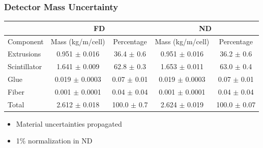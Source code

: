 \documentclass[10pt,professionalfonts,xcolor=table]{beamer}
\begin{document}
\begin{frame}
\frametitle{Detector Mass Uncertainty}
\begin{center}
\small
\begin{tabular}{|l|c|c|c|c|}
\hline
& \multicolumn{2}{c|}{FD} & \multicolumn{2}{c|}{ND} \\ \hline
Component    & Mass (kg/m/cell)   & Percentage & Mass (kg/m/cell) & Percentage \\ \hline
Extrusions   & 0.951 $\pm$ 0.016  & 36.4 $\pm$ 0.6  &  0.951 $\pm$ 0.016  & 36.2 $\pm$ 0.6 \\
Scintillator & 1.641 $\pm$ 0.009  & 62.8 $\pm$ 0.3  &  1.653 $\pm$ 0.011  & 63.0 $\pm$ 0.4 \\
Glue         & 0.019 $\pm$ 0.0003 & 0.07 $\pm$ 0.01 &  0.019 $\pm$ 0.0003 & 0.07 $\pm$ 0.01 \\
Fiber        & 0.001 $\pm$ 0.0001 & 0.04 $\pm$ 0.04 &  0.001 $\pm$ 0.0001 & 0.04 $\pm$ 0.04 \\ \hline
Total        & 2.612 $\pm$ 0.018  & 100.0 $\pm$ 0.7 &  2.624 $\pm$ 0.019  & 100.0 $\pm$ 0.07 \\ \hline
\end{tabular}
\end{center}

\begin{itemize}
\item Material uncertainties propagated
\item 1\% normalization in ND
\end{itemize}
\end{frame}
\end{document}
